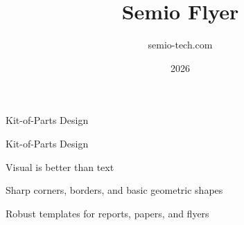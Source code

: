 \title{Semio Flyer}
\author{semio-tech.com}
\date{2026}



\maketitle

\begin{Panel}[anchor=top-right, x=1cm, y=1cm, width=5cm]
  Kit-of-Parts Design
\end{Panel}

\begin{Blockquote}
  \centering
  {\SemioSerif\Large Kit-of-Parts Design\par}
  \vspace{\SemioSpacingDouble}
  {\SemioSans Visual is better than text\par}
  \semioemblem[3cm]
\end{Blockquote}

\vfill
\begin{minipage}[t]{0.48\linewidth}
  \begin{Blockquote}[title=Design]
    Sharp corners, borders, and basic geometric shapes
  \end{Blockquote}
\end{minipage}\hfill
\begin{minipage}[t]{0.48\linewidth}
  \begin{Blockquote}[title=Build]
    Robust templates for reports, papers, and flyers
  \end{Blockquote}
\end{minipage}


